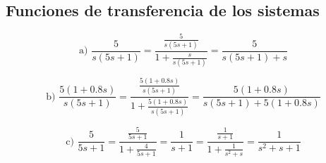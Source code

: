 \documentclass[10pt]{article}
\theoremstyle{definition}
\theoremstyle{remark}
\theoremstyle{definition}
\numberwithin{equation}{prob}
\begin{document}
\newpage

\subsection{Funciones de transferencia de los sistemas}

\begin{equation}
	\text{a) } \frac{5}{s(5s+1)} = \frac{\frac{5}{s(5s+1)}}{1 + \frac{s}{s(5s+1)}} = \frac{5}{s(5s+1) + s}
  \end{equation}
  
  \begin{equation}
	\text{b) } \frac{5(1+0.8s)}{s(5s+1)} = \frac{\frac{5(1+0.8s)}{s(5s+1)}}{1 + \frac{5(1+0.8s)}{s(5s+1)}} = \frac{5(1+0.8s)}{s(5s+1) + 5(1+0.8s)}
  \end{equation}
  
  \begin{equation}
	\text{c) } \frac{5}{5s+1} = \frac{\frac{5}{5s+1}}{1 + \frac{4}{5s+1}} = \frac{1}{s+1} = \frac{\frac{1}{s+1}}{1 + \frac{1}{s^2+s}} = \frac{1}{s^2 + s + 1}
  \end{equation}
\end{document}
